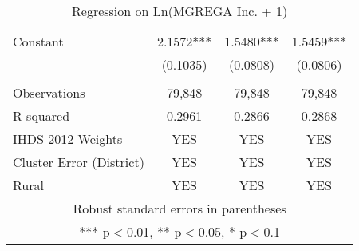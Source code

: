 \documentclass{article}
\begin{document}
\begin{landscape}
\begin{table}[]
\begin{tabular}{lccc}
Constant & 2.1572*** & 1.5480*** & 1.5459*** \\
 & (0.1035) & (0.0808) & (0.0806) \\
 &  &  &  \\ \hline
Observations & 79,848 & 79,848 & 79,848 \\
 R-squared & 0.2961 & 0.2866 & 0.2868 \\ 
 IHDS 2012 Weights & YES & YES & YES \\
Cluster Error (District) & YES & YES & YES \\
Rural & YES & YES & YES \\\hline
\multicolumn{4}{c}{ Robust standard errors in parentheses} \\
\multicolumn{4}{c}{ *** p$<$0.01, ** p$<$0.05, * p$<$0.1} \\\hline
\end{tabular}

    \caption{Regression on Ln(MGREGA Inc. + 1)}
    \label{tab4}
\end{table}

\end{landscape}
\end{document}
